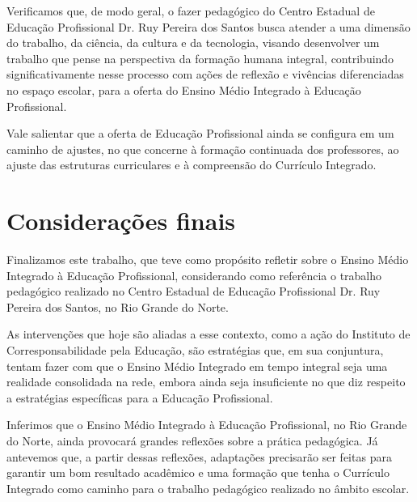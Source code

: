 \begin{refsection}
    Verificamos que, de modo geral, o fazer pedagógico do Centro Estadual de Educação Profissional Dr. Ruy Pereira dos Santos busca atender a uma dimensão do trabalho, da ciência, da cultura e da tecnologia, visando desenvolver um trabalho que pense na perspectiva da formação humana integral, contribuindo significativamente nesse processo com ações de reflexão e vivências diferenciadas no espaço escolar, para a oferta do Ensino Médio Integrado à Educação Profissional. 

    Vale salientar que a oferta de Educação Profissional ainda se configura em um caminho de ajustes, no que concerne à formação continuada dos professores, ao ajuste das estruturas curriculares e à compreensão do Currículo Integrado.

    \section{Considerações finais}

    Finalizamos este trabalho, que teve como propósito refletir sobre o Ensino Médio Integrado à Educação Profissional, considerando como referência o trabalho pedagógico realizado no Centro Estadual de Educação Profissional Dr. Ruy Pereira dos Santos, no Rio Grande do Norte.  

    As intervenções que hoje são aliadas a esse contexto, como a ação do Instituto de Corresponsabilidade pela Educação, são estratégias que, em sua conjuntura, tentam fazer com que o Ensino Médio Integrado em tempo integral seja uma realidade consolidada na rede, embora ainda seja insuficiente no que diz respeito a estratégias específicas para a Educação Profissional. 

    Inferimos que o Ensino Médio Integrado à Educação Profissional, no Rio Grande do Norte, ainda provocará grandes reflexões sobre a prática pedagógica. Já antevemos que, a partir dessas reflexões, adaptações precisarão ser feitas para garantir um bom resultado acadêmico e uma formação que tenha o Currículo Integrado como caminho para o trabalho pedagógico realizado no âmbito escolar.  

    \nocite{Decreto5154-2004}
    \printbibliography[heading=subbibliography,notcategory=fullcited]

    \label{chap:reflexao-fazer-pedagogicoend}

\end{refsection}
